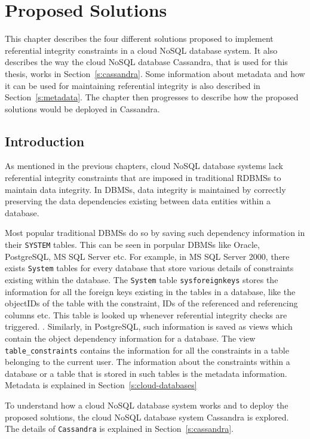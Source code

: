 \chapter{Proposed Solutions} \label{c:solutions}

This chapter describes the four different solutions proposed to implement
referential integrity constraints in a cloud \ac{NoSQL} database system. It also
describes the way the cloud \ac{NoSQL} database Cassandra, that is used
for this thesis, works in Section~\ref{s:cassandra}. Some information
about metadata and how it can be used for maintaining referential integrity is also described in
Section~\ref{s:metadata}. The chapter then progresses to describe how the
proposed solutions would be deployed in Cassandra.


\section{Introduction}

As mentioned in the previous chapters, cloud \ac{NoSQL} database systems lack
referential integrity constraints that are imposed in traditional \acp{RDBMS} to
maintain data integrity. In \acp{DBMS}, data integrity is maintained by
correctly preserving the data dependencies existing between data entities within
a database.

Most popular traditional \acp{DBMS} do so by saving such dependency information
in their \texttt{SYSTEM} tables. This can be seen in porpular \acp{DBMS} like
Oracle, PostgreSQL, MS SQL Server etc. For example, in MS SQL Server 2000, there
exists \texttt{System} tables for every database that store various details of
constraints existing within the database. The \texttt{System} table
\texttt{sysforeignkeys} stores the information for all the foreign keys existing
in the tables in a database, like the objectIDs of the table with the constraint,
IDs of the referenced and referencing columns etc. This table is looked up
whenever referential integrity checks are triggered. \citep{sys:msdn}.
Similarly, in PostgreSQL, such information is saved as views which contain the
object dependency information for a database. The view
\texttt{table\_constraints} contains the information for all the constraints in
a table belonging to the current user.%
The information about the constraints within a database or a table that is
stored in such tables is the metadata information. Metadata is explained in
 Section~\ref{s:cloud-databases}  

To understand how a cloud \ac{NoSQL} database system works and to deploy
the proposed solutions, the cloud \ac{NoSQL} database system Cassandra
is explored. The details of \texttt{Cassandra} is explained in
Section~\ref{s:cassandra}.


